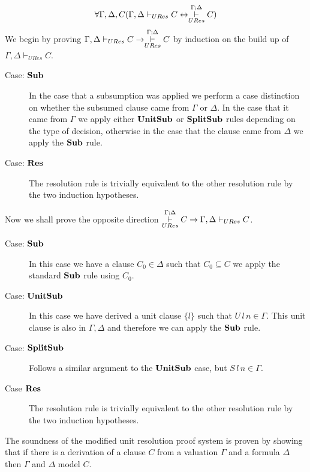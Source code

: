 \begin{mytheorem}
\begin{align*}
\forall \Gamma,\Delta,C ( \Gamma,\Delta \vdash_{URes} C  \leftrightarrow   \overset{\Gamma;\Delta}{\underset{URes}{\vdash}} C )
\end{align*}
 We begin by proving $\Gamma,\Delta \vdash_{URes} C  \to   \overset{\Gamma;\Delta}{\underset{URes}{\vdash}} C$ by induction on the build up of $\Gamma, \Delta \vdash_{URes} C$.
\begin{description}

\item[Case: $\mathbf{Sub}$]
In the case that a subsumption was applied we perform a case distinction on whether the subsumed clause came from $\Gamma$ or $\Delta$. In the case that it came from $\Gamma$ we apply either $\mathbf{UnitSub}$ or $\mathbf{SplitSub}$ rules depending on the type of decision, otherwise in the case that the clause came from $\Delta$ we apply the $\mathbf{Sub}$ rule.
\item[Case: $\mathbf{Res}$]
The resolution rule is trivially equivalent to the other resolution rule by the two induction hypotheses.
\end{description}
Now we shall prove the opposite direction   $\overset{\Gamma;\Delta}{\underset{URes}{\vdash}} C \to \Gamma,\Delta \vdash_{URes} C $.
\begin{description}
\item[Case: $\mathbf{Sub}$]
In this case we have a clause $C_0 \in \Delta$ such that $C_0 \subseteq C$ we apply the standard $\mathbf{Sub}$ rule using $C_0$.
\item[Case: $\mathbf{UnitSub}$]
In this case we have derived a unit clause $\{ l \}$ such that $U \, l \, n \in \Gamma$. This unit clause is also in $\Gamma,\Delta$ and therefore we can apply the  $\mathbf{Sub}$ rule.
\item[Case: $\mathbf{SplitSub}$] 
Follows a similar argument to the $\mathbf{UnitSub}$ case, but $S \, l \, n \in \Gamma$.
\item[Case $\mathbf{Res}$]
The resolution rule is trivially equivalent to the other resolution rule by the two induction hypotheses.
\end{description}

\end{mytheorem}
\medskip
The soundness of the modified unit resolution proof system is proven by showing that if there is a derivation of a clause $C$ from a valuation $\Gamma$ and a formula $\Delta$ then $\Gamma$ and $\Delta$ model $C$. \\

